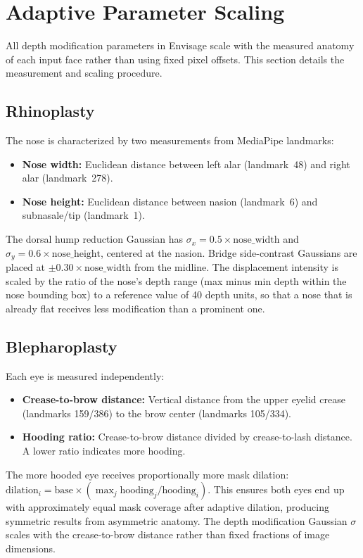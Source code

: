 \documentclass[10pt,twocolumn,letterpaper]{article}
\newcommand{\method}{Envisage}
\begin{document}
\section{Adaptive Parameter Scaling}

All depth modification parameters in \method{} scale with the measured
anatomy of each input face rather than using fixed pixel offsets. This
section details the measurement and scaling procedure.

\subsection{Rhinoplasty}

The nose is characterized by two measurements from MediaPipe landmarks:
\begin{itemize}
  \item \textbf{Nose width:} Euclidean distance between left alar
    (landmark~48) and right alar (landmark~278).
  \item \textbf{Nose height:} Euclidean distance between nasion
    (landmark~6) and subnasale/tip (landmark~1).
\end{itemize}

The dorsal hump reduction Gaussian has $\sigma_x = 0.5 \times
\text{nose\_width}$ and $\sigma_y = 0.6 \times \text{nose\_height}$,
centered at the nasion. Bridge side-contrast Gaussians are placed at
$\pm 0.30 \times \text{nose\_width}$ from the midline. The displacement
intensity is scaled by the ratio of the nose's depth range (max minus min
depth within the nose bounding box) to a reference value of 40 depth
units, so that a nose that is already flat receives less modification than
a prominent one.

\subsection{Blepharoplasty}

Each eye is measured independently:
\begin{itemize}
  \item \textbf{Crease-to-brow distance:} Vertical distance from the
    upper eyelid crease (landmarks 159/386) to the brow center (landmarks
    105/334).
  \item \textbf{Hooding ratio:} Crease-to-brow distance divided by
    crease-to-lash distance. A lower ratio indicates more hooding.
\end{itemize}

The more hooded eye receives proportionally more mask dilation:
$\text{dilation}_i = \text{base} \times (\max_j \text{hooding}_j /
\text{hooding}_i)$. This ensures both eyes end up with approximately
equal mask coverage after adaptive dilation, producing symmetric results
from asymmetric anatomy. The depth modification Gaussian $\sigma$ scales
with the crease-to-brow distance rather than fixed fractions of image
dimensions.
\end{document}
